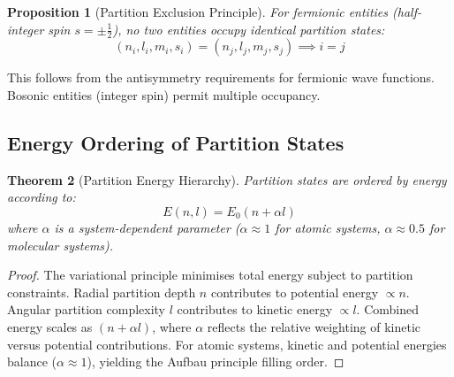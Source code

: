 \documentclass[11pt,a4paper]{article}
\newtheorem{theorem}{Theorem}[section]
\newtheorem{proposition}[theorem]{Proposition}
\theoremstyle{remark}
\begin{document}
\begin{proposition}[Partition Exclusion Principle]
\label{prop:partition_exclusion}
For fermionic entities (half-integer spin $s = \pm\frac{1}{2}$), no two entities occupy identical partition states:
\begin{equation}
(n_i, l_i, m_i, s_i) = (n_j, l_j, m_j, s_j) \implies i = j
\end{equation}
\end{proposition}

This follows from the antisymmetry requirements for fermionic wave functions. Bosonic entities (integer spin) permit multiple occupancy.

\subsection{Energy Ordering of Partition States}

\begin{theorem}[Partition Energy Hierarchy]
\label{thm:energy_hierarchy}
Partition states are ordered by energy according to:
\begin{equation}
E(n, l) = E_0(n + \alpha l)
\end{equation}
where $\alpha$ is a system-dependent parameter ($\alpha \approx 1$ for atomic systems, $\alpha \approx 0.5$ for molecular systems).
\end{theorem}

\begin{proof}
The variational principle minimises total energy subject to partition constraints. Radial partition depth $n$ contributes to potential energy $\propto n$. Angular partition complexity $l$ contributes to kinetic energy $\propto l$. Combined energy scales as $(n + \alpha l)$, where $\alpha$ reflects the relative weighting of kinetic versus potential contributions. For atomic systems, kinetic and potential energies balance ($\alpha \approx 1$), yielding the Aufbau principle filling order.
\end{proof}
\end{document}
